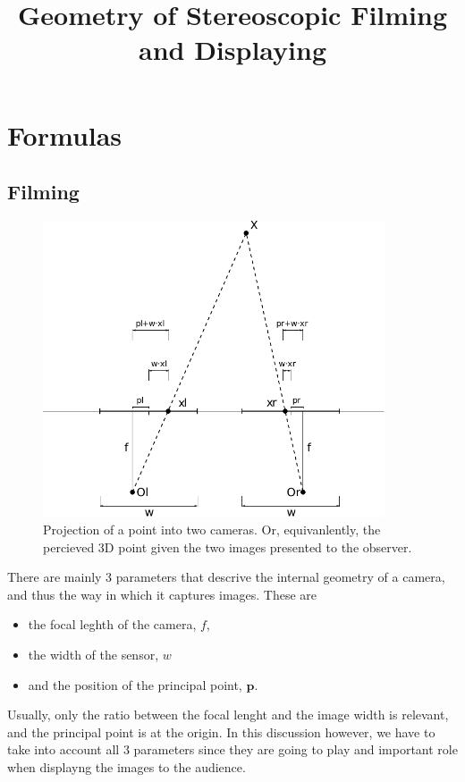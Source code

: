 \documentclass[12pt,a4paper]{article}
\def\p{\mathbf p}
\begin{document}
\title{Geometry of Stereoscopic Filming and Displaying}
\author{}
\maketitle
\tableofcontents


\section{Formulas}

\subsection{Filming}
\begin{figure}
 \begin{center}
  \includegraphics[width=0.9\textwidth]{stereo_projection.pdf}
 \end{center}
 \caption{Projection of a point into two cameras.  Or, equivanlently, the percieved 3D point given the two images presented to the observer.}
\end{figure}


There are mainly 3 parameters that descrive the internal geometry of a camera, and thus the way in which it captures images.  These are
\begin{itemize}
 \item the focal leghth of the camera, $f$,
 \item the width of the sensor, $w$
 \item and the position of the principal point, $\p$.
\end{itemize}
Usually, only the ratio between the focal lenght and the image width is relevant, and the principal point is at the origin.  In this discussion however, we have to take into account all 3 parameters since they are going to play and important role when displayng the images to the audience.
\end{document}
